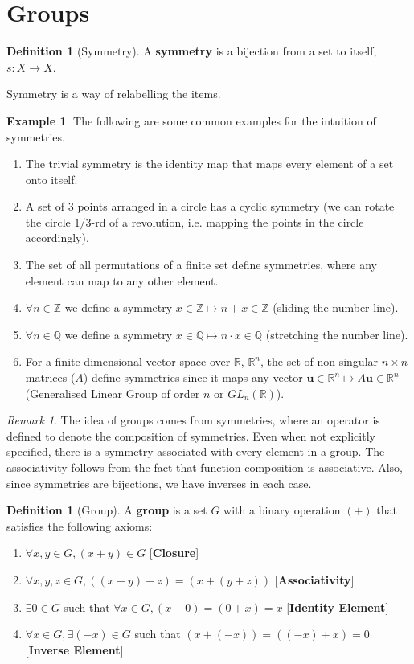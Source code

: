 \documentclass[a4paper,12pt]{report}
\newcommand{\Z}{\mathbb{Z}}
\newcommand{\Q}{\mathbb{Q}}
\newcommand{\R}{\mathbb{R}}
\newcommand{\bm}{\boldsymbol}
\newcommand{\tb}{\textbf}
\theoremstyle{plain}
\theoremstyle{definition}
\newtheorem{definition}[theorem]{\color{red}Definition} %
\newtheorem{example}[theorem]{\color{Orange}Example} %
\theoremstyle{remark}
\newtheorem{remark}[theorem]{\color{ForestGreen}Remark} %
\begin{document}
\section{Groups}
\begin{definition}[Symmetry]
A \tb{symmetry} is a bijection from a set to itself, $s:X\to X$.
\end{definition}
\begin{insight}
Symmetry is a way of relabelling the items.
\end{insight}
\begin{example}
The following are some common examples for the intuition of symmetries.
\begin{enumerate}
\item The trivial symmetry is the identity map that maps every element of a set onto itself.
\item A set of 3 points arranged in a circle has a cyclic symmetry (we can rotate the circle $1/3$-rd of a revolution, i.e. mapping the points in the circle accordingly).
\item The set of all permutations of a finite set define symmetries, where any element can map to any other element.
\item $\forall n\in\Z$ we define a symmetry $x\in\Z\mapsto n+x\in\Z$ (sliding the number line).
\item $\forall n\in\Q$ we define a symmetry $x\in\Q\mapsto n\cdot x\in\Q$ (stretching the number line).
\item For a finite-dimensional vector-space over $\R$, $\R^n$, the set of non-singular $n\times n$ matrices ($A$) define symmetries since it maps any vector $\bm{u}\in\R^n\mapsto A\bm{u}\in\R^n$ (Generalised Linear Group of order $n$ or $GL_n(\R)$).
\end{enumerate}
\end{example}
\begin{remark}
The idea of groups comes from symmetries, where an operator is defined to denote the composition of symmetries. Even when not explicitly specified, there is a symmetry associated with every element in a group. The associativity follows from the fact that function composition is associative. Also, since symmetries are bijections, we have inverses in each case.
\end{remark}
\begin{definition}[Group]
A \tb{group} is a set $G$ with a binary operation $(+)$ that satisfies the following axioms:
\begin{enumerate}
\item $\forall x,y\in G, (x+y)\in G$ [\tb{Closure}]
\item $\forall x,y,z\in G, ((x+y)+z)=(x+(y+z))$ [\tb{Associativity}]
\item $\exists 0\in G$ such that $\forall x\in G, (x+0)=(0+x)=x$ [\tb{Identity Element}]
\item $\forall x\in G, \exists (-x)\in G$ such that $(x+(-x))=((-x)+x)=0$ [\tb{Inverse Element}]
\end{enumerate}
\end{definition}
\end{document}
